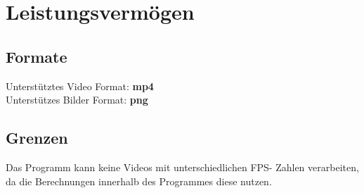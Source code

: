 \chapter{Leistungsvermögen}

\section{Formate}
Unterstütztes Video Format: \textbf{mp4} \\
Unterstützes Bilder Format: \textbf{png}

\section{Grenzen}
Das Programm kann keine Videos mit unterschiedlichen FPS- Zahlen verarbeiten, da die Berechnungen innerhalb des Programmes diese nutzen.
